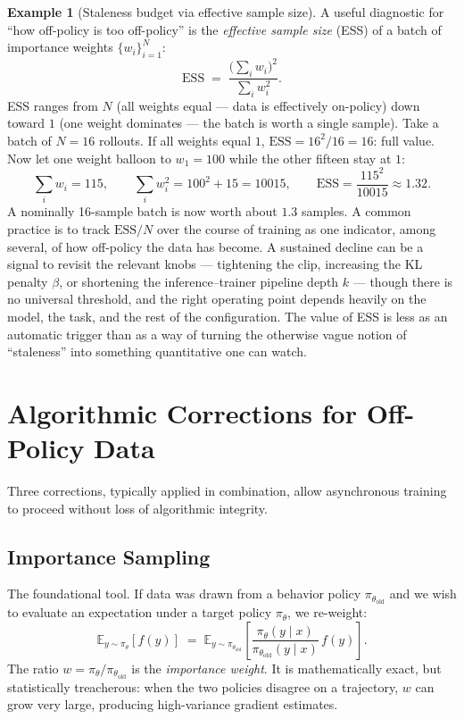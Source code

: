 \documentclass[11pt,a4paper]{article}
\theoremstyle{definition}
\newtheorem{example}[definition]{Example}
\theoremstyle{plain}
\newcommand{\E}{\mathbb{E}}
\newcommand{\policy}{\pi_\theta}
\newcommand{\oldpolicy}{\pi_{\theta_{\text{old}}}}
\begin{document}
\begin{example}[Staleness budget via effective sample size]
A useful diagnostic for ``how off-policy is too off-policy'' is the
\emph{effective sample size} (ESS) of a batch of importance weights
$\{w_i\}_{i=1}^{N}$:
\begin{equation}
  \mathrm{ESS}
  \;=\; \frac{\bigl(\sum_{i} w_i\bigr)^2}{\sum_{i} w_i^{2}}.
\end{equation}
ESS ranges from $N$ (all weights equal --- data is effectively on-policy)
down toward $1$ (one weight dominates --- the batch is worth a single
sample). Take a batch of $N = 16$ rollouts. If all weights equal $1$,
$\mathrm{ESS} = 16^2/16 = 16$: full value. Now let one weight balloon to
$w_1 = 100$ while the other fifteen stay at $1$:
\[
  \sum_i w_i = 115,\qquad
  \sum_i w_i^2 = 100^2 + 15 = 10015,\qquad
  \mathrm{ESS} = \frac{115^2}{10015} \approx 1.32.
\]
A nominally 16-sample batch is now worth about $1.3$ samples. A common
practice is to track $\mathrm{ESS}/N$ over the course of training as one
indicator, among several, of how off-policy the data has become. A sustained
decline can be a signal to revisit the relevant knobs --- tightening the clip,
increasing the KL penalty $\beta$, or shortening the inference--trainer
pipeline depth $k$ --- though there is no universal threshold, and the right
operating point depends heavily on the model, the task, and the rest of the
configuration. The value of ESS is less as an automatic trigger than as a way
of turning the otherwise vague notion of ``staleness'' into something
quantitative one can watch.
\end{example}

\section{Algorithmic Corrections for Off-Policy Data}\label{sec:async-corrections}

Three corrections, typically applied in combination, allow asynchronous training to proceed without loss of algorithmic integrity.

\subsection{Importance Sampling}

The foundational tool. If data was drawn from a behavior policy $\oldpolicy$ and we wish to evaluate an expectation under a target policy $\policy$, we re-weight:
\begin{equation}
  \E_{y \sim \policy}[f(y)] \;=\; \E_{y \sim \oldpolicy}\!\left[\frac{\policy(y \mid x)}{\oldpolicy(y \mid x)}\, f(y)\right].
\end{equation}
The ratio $w = \policy/\oldpolicy$ is the \emph{importance weight}. It is mathematically exact, but statistically treacherous: when the two policies disagree on a trajectory, $w$ can grow very large, producing high-variance gradient estimates.
\end{document}
